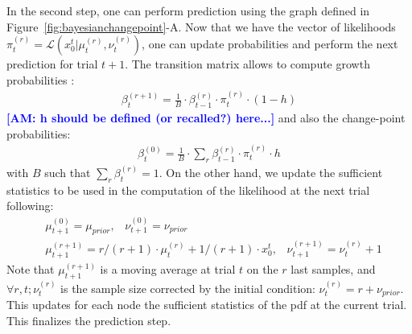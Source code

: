 \documentclass[12pt,english]{article}%
\newcommand{\eqa}[1]{\begin{align}#1\end{align}}
\newcommand{\Ll}{\mathcal{L}}
\newcommand{\seeFig}[1]{Figure~\ref{fig:#1}}
\newcommand{\seeEq}[1]{Equation~\ref{eq:#1}}
\newcommand{\AM}[1]{\textbf{\textcolor{blue}{[AM: #1]}}}
\begin{document}
In the second step, one can perform prediction
using the graph defined in \seeFig{bayesianchangepoint}-A.
Now that we have the vector of likelihoods $\pi^{(r)}_t=\Ll(x_0^t |  \mu^{(r)}_{t}, \nu^{(r)}_{t})$,
one can update probabilities and perform the next prediction for trial $t+1$.
The transition matrix %
allows to compute growth probabilities : %
\eqa{
\beta^{(r+1)}_t = \frac{1}{B} \cdot \beta^{(r)}_{t-1} \cdot \pi^{(r)}_{t} \cdot (1-h)
}
\AM{h should be defined (or recalled?) here...}
and also the change-point probabilities:
\eqa{
\beta^{(0)}_t  = \frac{1}{B} \cdot \sum_{r} \beta^{(r)}_{t-1} \cdot \pi^{(r)}_{t} \cdot h
}
with $B$ such that $\sum_{r} \beta^{(r)}_{t} = 1$.
On the other hand, we update the sufficient statistics to be used in the computation of the likelihood at the next trial following:
\eqa{
& \mu^{(0)}_{t+1} = \mu_{prior} \text{,} \quad \nu^{(0)}_{t+1} = \nu_{prior} \\
& \mu^{(r+1)}_{t+1} = r/(r+1) \cdot \mu^{(r)}_{t} + 1/(r+1) \cdot x_0^t \text{,} \quad \nu^{(r+1)}_{t+1} = \nu^{(r)}_{t} + 1
}
Note that $\mu^{(r+1)}_{t+1}$ is a moving average at trial $t$ on the $r$ last samples,
and $\forall r, t; \nu^{(r)}_{t}$ is the sample size corrected by the initial condition:
$\nu^{(r)}_{t} = r + \nu_{prior}$.
This updates for each node the sufficient statistics of the pdf at the current trial.
This finalizes the prediction step.
\end{document}
